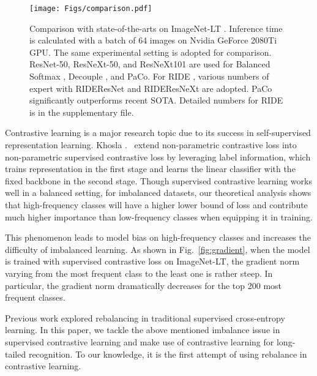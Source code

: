 \documentclass[10pt,twocolumn,letterpaper]{article}
\begin{document}
\begin{figure}[tb!]
	\begin{center}
		\texttt{[image: Figs/comparison.pdf]}
		\caption{Comparison with state-of-the-arts on ImageNet-LT \cite{Liu_2019_CVPR}. Inference time is calculated with a batch of 64 images on Nvidia GeForce 2080Ti GPU. The same experimental setting is adopted for comparison. ResNet-50, ResNeXt-50, and ResNeXt101 are used for Balanced Softmax \cite{DBLP:conf/nips/RenYSMZYL20}, Decouple \cite{DBLP:conf/iclr/KangXRYGFK20}, and PaCo. For RIDE \cite{DBLP:journals/corr/abs-2010-01809}, various numbers of expert with RIDEResNet and RIDEResNeXt are adopted. PaCo significantly outperforms recent SOTA. Detailed numbers for RIDE is in the supplementary file.}
		\label{fig:PaCo_comparison}
		\vspace{-0.1in}
	\end{center}
\end{figure}

Contrastive learning \cite{DBLP:conf/icml/ChenK0H20, DBLP:conf/cvpr/He0WXG20, DBLP:journals/corr/abs-2003-04297, DBLP:conf/nips/GrillSATRBDPGAP20, DBLP:conf/nips/CaronMMGBJ20} is a major research topic due to its success in self-supervised representation learning. Khosla \etal.~\cite{DBLP:conf/nips/KhoslaTWSTIMLK20} extend non-parametric contrastive loss into non-parametric supervised contrastive loss by leveraging label information, which trains representation in the first stage and learns the linear classifier with the fixed backbone in the second stage. Though supervised contrastive learning works well in a balanced setting, for imbalanced datasets, our theoretical analysis shows that high-frequency classes will have a higher lower bound of loss and contribute much higher importance than low-frequency classes when equipping it in training.

This phenomenon leads to model bias on high-frequency classes and increases the difficulty of imbalanced learning.
As shown in Fig.~\ref{fig:gradient}, when the model is trained with supervised contrastive loss on ImageNet-LT, the gradient norm varying from the most frequent class to the least one is rather steep. In particular, the gradient norm dramatically decreases for the top 200 most frequent classes.    

Previous work \cite{DBLP:journals/nn/BudaMM18,DBLP:conf/cvpr/HuangLLT16,DBLP:conf/cvpr/CuiJLSB19, he2009learning,chawla2002smote, shen2016relay, DBLP:conf/nips/RenYSMZYL20, DBLP:conf/iclr/KangXRYGFK20, DBLP:journals/corr/abs-2010-01809, DBLP:journals/corr/abs-2101-10633, DBLP:conf/nips/TangHZ20, DBLP:journals/corr/abs-2101-10633, Zhong_2021_CVPR} explored rebalancing in traditional supervised cross-entropy learning. In this paper, we tackle the above mentioned imbalance issue in supervised contrastive learning and make use of contrastive learning for long-tailed recognition. To our knowledge, it is the first attempt of using rebalance in contrastive learning. 
\end{document}
